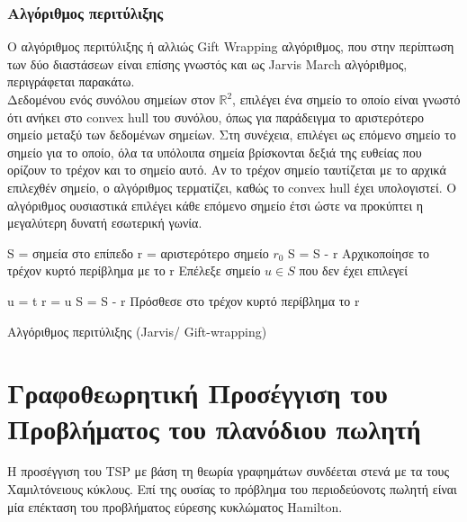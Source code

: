 \documentclass[oneside,12pt]{book}
\newcommand{\R}{\mathbb{R}}
\theoremstyle{definition}
\begin{document}
\subsection{Αλγόριθμος περιτύλιξης}

Ο αλγόριθμος περιτύλιξης ή αλλιώς Gift Wrapping αλγόριθμος, που στην περίπτωση των δύο διαστάσεων είναι
επίσης γνωστός και ως Jarvis March αλγόριθμος, περιγράφεται παρακάτω. \\

Δεδομένου ενός συνόλου σημείων στον \( \R^2 \),	επιλέγει ένα σημείο το οποίο είναι γνωστό ότι ανήκει στο convex hull του συνόλου, όπως για παράδειγμα το αριστερότερο σημείο μεταξύ των δεδομένων σημείων. Στη συνέχεια, επιλέγει ως επόμενο σημείο το σημείο για το οποίο, όλα τα υπόλοιπα σημεία βρίσκονται δεξιά της ευθείας που ορίζουν το τρέχον και το σημείο αυτό. Αν το τρέχον σημείο ταυτίζεται με το αρχικά επιλεχθέν σημείο, ο αλγόριθμος τερματίζει, καθώς το convex hull έχει υπολογιστεί. Ο αλγόριθμος ουσιαστικά επιλέγει κάθε επόμενο σημείο έτσι ώστε να προκύπτει η μεγαλύτερη δυνατή εσωτερική γωνία. \\

\begin{algorithm}[H]
	\SetAlgoLined
	
	S = σημεία στο επίπεδο \;
	r = αριστερότερο σημείο \(r_0\) \;
	S = S - r \;
	Αρχικοποίησε το τρέχον κυρτό περίβλημα με το r \;
	Επέλεξε σημείο \(u \in S\) που δεν έχει επιλεγεί \;
		
	{
		{
			{
				u = t		
			}
		}
		r = u \;
		S = S - {r} \;
		Πρόσθεσε στο τρέχον κυρτό περίβλημα το r \;
	}
	
	\caption{Αλγόριθμος περιτύλιξης (Jarvis/ Gift-wrapping)}
\end{algorithm}

\chapter{Γραφοθεωρητική Προσέγγιση του Προβλήματος του πλανόδιου πωλητή}
 
Η προσέγγιση του TSP με βάση τη θεωρία γραφημάτων συνδέεται στενά με τα τους Χαμιλτόνειους κύκλους. Επί της ουσίας το πρόβλημα του περιοδεύονοτς πωλητή είναι μία επέκταση του προβλήματος εύρεσης κυκλώματος Hamilton. \\ 
\end{document}
